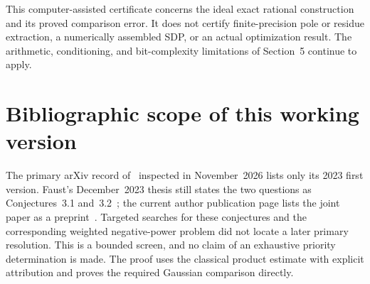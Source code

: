 \documentclass[11pt]{article}
\numberwithin{equation}{section}
\begin{document}
This computer-assisted certificate concerns the ideal exact rational
construction and its proved comparison error. It does not certify
finite-precision pole or residue extraction, a numerically assembled
SDP, or an actual optimization result. The arithmetic, conditioning,
and bit-complexity limitations of Section~5 continue to apply.

\section*{Bibliographic scope of this working version}

The primary arXiv record of~\cite{FF} inspected in November~2026 lists
only its 2023 first version. Faust's December~2023 thesis still states
the two questions as Conjectures~3.1 and~3.2~\cite{FaustThesis}; the
current author publication page lists the joint paper as a
preprint~\cite{FawziPage}. Targeted searches for these conjectures and
the corresponding weighted negative-power problem did not locate a
later primary resolution. This is a bounded screen, and no claim of an
exhaustive priority determination is made. The proof uses the classical
product estimate with explicit attribution and proves the required
Gaussian comparison directly.
\end{document}
